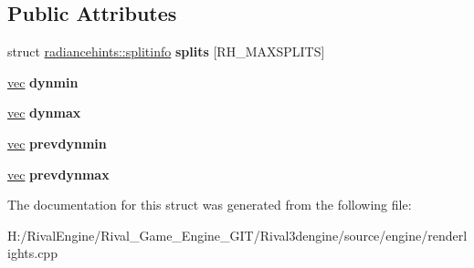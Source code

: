 \subsection*{Public Attributes}
\begin{DoxyCompactItemize}
\item 
\mbox{\label{structradiancehints_ab4155ae19d164be8b1a0d8057f6297e7}} 
struct \hyperlink{structradiancehints_1_1splitinfo}{radiancehints\+::splitinfo} {\bfseries splits} \mbox{[}R\+H\+\_\+\+M\+A\+X\+S\+P\+L\+I\+TS\mbox{]}
\item 
\mbox{\label{structradiancehints_a0ef25cf3ef68e749f082509679702565}} 
\hyperlink{structvec}{vec} {\bfseries dynmin}
\item 
\mbox{\label{structradiancehints_a8e796e64dd300416731c015d04b93d5b}} 
\hyperlink{structvec}{vec} {\bfseries dynmax}
\item 
\mbox{\label{structradiancehints_ab3a981cfd373904f0996eaa7a218639b}} 
\hyperlink{structvec}{vec} {\bfseries prevdynmin}
\item 
\mbox{\label{structradiancehints_afd2389a886d1868b58d8aa05c463aada}} 
\hyperlink{structvec}{vec} {\bfseries prevdynmax}
\end{DoxyCompactItemize}


The documentation for this struct was generated from the following file\+:\begin{DoxyCompactItemize}
\item 
H\+:/\+Rival\+Engine/\+Rival\+\_\+\+Game\+\_\+\+Engine\+\_\+\+G\+I\+T/\+Rival3dengine/source/engine/renderlights.\+cpp\end{DoxyCompactItemize}
